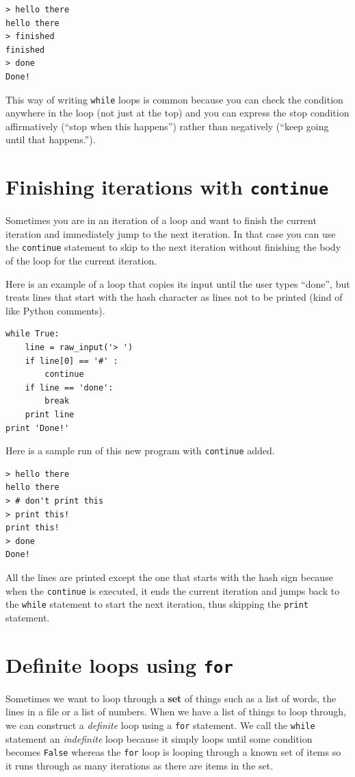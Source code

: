 \documentclass[10pt]{book}
\begin{document}
\beforeverb
\begin{verbatim}
> hello there
hello there
> finished
finished
> done
Done!
\end{verbatim}
\afterverb
%
This way of writing {\tt while} loops is common because you
can check the condition anywhere in the loop (not just at the
top) and you can express the stop condition affirmatively
(``stop when this happens'') rather than negatively (``keep going
until that happens.'').

\section{Finishing iterations with {\tt continue}}

Sometimes you are in an iteration of a loop and want to finish the
current iteration and immediately jump to the next iteration.
In that case you can use the {\tt continue}
statement to skip to the next iteration without finishing the
body of the loop for the current iteration.

Here is an example of a loop that copies its input until the user
types ``done'', but treats lines that start with the hash character
as lines not to be printed (kind of like Python comments).

\beforeverb
\begin{verbatim}
while True:
    line = raw_input('> ')
    if line[0] == '#' :
        continue
    if line == 'done':
        break
    print line
print 'Done!'
\end{verbatim}
\afterverb
%
Here is a sample run of this new program with {\tt continue} added.

\beforeverb
\begin{verbatim}
> hello there
hello there
> # don't print this
> print this!
print this!
> done
Done!
\end{verbatim}
\afterverb
%
All the lines are printed except the one that starts with the hash
sign because when the {\tt continue} is executed, it ends 
the current iteration and jumps
back to the {\tt while} statement to start the next iteration, thus 
skipping the {\tt print} statement.

\section{Definite loops using {\tt for} }

Sometimes we want to loop through a {\bf set} of things such 
as a list of words, the lines in a file or a list of numbers.
When we have a list of things to loop through, we can
construct a {\em definite} loop using a {\tt for} statement.
We call the {\tt while} statement an {\em indefinite} loop
because it simply loops until some condition becomes {\tt False} 
whereas the {\tt for} loop is looping through a known
set of items so it runs through as many iterations as there
are items in the set.
\end{document}
